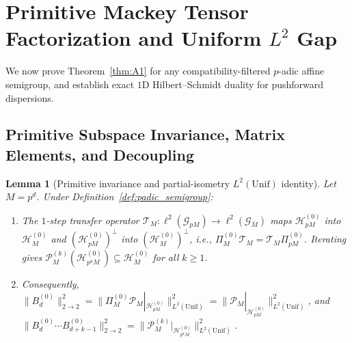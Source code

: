 \documentclass[11pt,a4paper]{article}
\numberwithin{equation}{section}
\newtheorem{lemma}[theorem]{Lemma}
\theoremstyle{definition}
\theoremstyle{remark}
\newcommand{\cG}{\mathcal{G}}
\newcommand{\cH}{\mathcal{H}}
\newcommand{\cT}{\mathcal{T}}
\newcommand{\cP}{\mathcal{P}}
\newcommand{\Unif}{\mathrm{Unif}}
\begin{document}
\section{Primitive Mackey Tensor Factorization and Uniform $L^2$ Gap}\label{sec:tensor_A1}

We now prove Theorem~\ref{thm:A1} for any compatibility-filtered $p$-adic affine semigroup, and establish exact $1$D Hilbert--Schmidt duality for pushforward dispersions.

\subsection{Primitive Subspace Invariance, Matrix Elements, and Decoupling}\label{subsec:tensor_proof}

\begin{lemma}[Primitive invariance and partial-isometry $L^2(\Unif)$ identity]\label{lem:prim_invariance}
Let $M = p^d$. Under Definition~\ref{def:padic_semigroup}:
\begin{enumerate}[label=(\arabic*)]
\item The $1$-step transfer operator $\cT_M : \ell^2(\cG_{pM}) \to \ell^2(\cG_M)$ maps $\cH_{pM}^{(0)}$ into $\cH_M^{(0)}$ and $(\cH_{pM}^{(0)})^\perp$ into $(\cH_M^{(0)})^\perp$, i.e., $\Pi_M^{(0)} \cT_M = \cT_M \Pi_{pM}^{(0)}$. Iterating gives $\cP_M^{(k)}(\cH_{p^k M}^{(0)}) \subseteq \cH_M^{(0)}$ for all $k \ge 1$.
\item Consequently, $\|B_d^{(0)}\|_{2\to 2}^2 = \|\Pi_M^{(0)}\cP_M|_{\cH_{pM}^{(0)}}\|_{L^2(\Unif)}^2 = \|\cP_M|_{\cH_{pM}^{(0)}}\|_{L^2(\Unif)}^2$, and $\|B_d^{(0)}\cdots B_{d+k-1}^{(0)}\|_{2\to 2}^2 = \|\cP_M^{(k)}|_{\cH_{p^k M}^{(0)}}\|_{L^2(\Unif)}^2$.
\end{enumerate}
\end{lemma}
\end{document}
